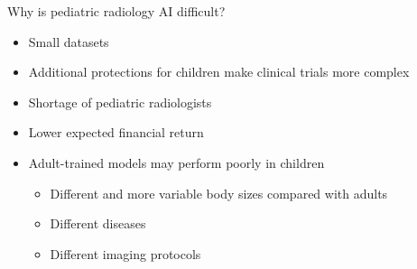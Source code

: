 \documentclass[aspectratio=169]{beamer}
\begin{document}
\begin{frame}{Why is pediatric radiology AI difficult?}
\vspace{-4pt}
\begin{itemize}
  \item Small datasets
  \item Additional protections for children make clinical trials more complex
  \item Shortage of pediatric radiologists
  \item Lower expected financial return
  \item Adult-trained models may perform poorly in children
  \begin{itemize}
    \item Different and more variable body sizes compared with adults
    \item Different diseases
    \item Different imaging protocols
  \end{itemize}
\end{itemize}
\end{frame}
\end{document}
